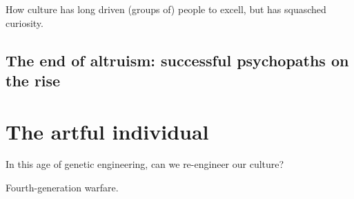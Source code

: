 \documentclass{article}
\begin{document}
How culture has long driven (groups of) people to excell, but has squasched curiosity.

\subsection{The end of altruism: successful psychopaths on the rise}

\section{The artful individual}

In this age of genetic engineering, can we re-engineer our culture?

Fourth-generation warfare.



\end{document}

